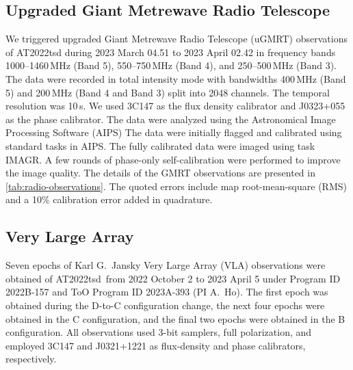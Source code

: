 \documentclass{nature_plusfigure}
\newcommand{\at}{AT2022tsd}
\begin{document}
\begin{methods}


\subsection{Upgraded Giant Metrewave Radio Telescope}
\label{sec:GMRT}

We triggered upgraded Giant Metrewave Radio Telescope (uGMRT) observations of AT2022tsd
during 2023 March 04.51 to 2023 April 02.42 in frequency bands 1000--1460\,MHz
(Band 5), 550--750\,MHz (Band 4), and 250--500\,MHz (Band 3). The data were recorded
in total intensity mode with bandwidths 400\,MHz (Band 5) and 200\,MHz (Band 4 and Band 3)
split into 2048 channels. The temporal resolution was 10\,s. We used 3C147 as the flux density
calibrator and J0323+055 as the phase calibrator.
The data were analyzed\cite{Nayana2017} using the Astronomical Image Processing Software (AIPS\cite{Greisen2003})
The data were initially flagged and calibrated using standard tasks in AIPS. The fully calibrated data were imaged
using task IMAGR. A few rounds of phase-only self-calibration were performed to improve the
image quality. The details of the GMRT observations are presented in \ref{tab:radio-observations}. The quoted errors
include map root-mean-square (RMS) and a 10\% calibration error added in quadrature.

\subsection{Very Large Array}
\label{sec:VLA}

Seven epochs of Karl G.\ Jansky Very Large Array (VLA\cite{Perley2011}) observations were obtained of \at\ from 2022 October 2 to 2023 April 5 under Program ID 2022B-157 and ToO Program ID 2023A-393 (PI A.\ Ho).
The first epoch was obtained during the D-to-C configuration change, the next four epochs were obtained in the C configuration, and the final two epochs were obtained in the B configuration.
All observations used 3-bit samplers, full polarization, and employed 3C147 and J0321+1221 as flux-density and phase calibrators, respectively.


\end{methods}
\end{document}
